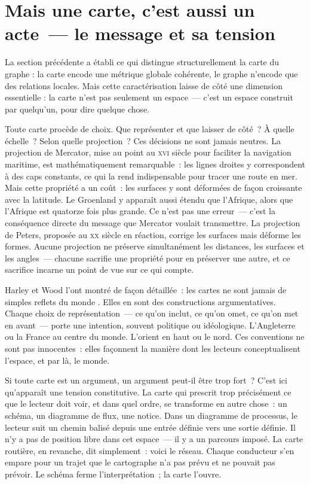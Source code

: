 \section[Le message et sa tension]{Mais une carte, c'est aussi un acte~--- le message et sa tension}

La section précédente a établi ce qui distingue structurellement la carte du graphe : la carte encode une métrique globale cohérente, le graphe n'encode que des relations locales. Mais cette caractérisation laisse de côté une dimension essentielle : la carte n'est pas seulement un espace~--- c'est un espace construit par quelqu'un, pour dire quelque chose.

Toute carte procède de choix. Que représenter et que laisser de côté~? À quelle échelle~? Selon quelle projection~? Ces décisions ne sont jamais neutres. La projection de Mercator, mise au point au \textsc{xvi} siècle pour faciliter la navigation maritime, est mathématiquement remarquable~: les lignes droites y correspondent à des caps constants, ce qui la rend indispensable pour tracer une route en mer. Mais cette propriété a un coût~: les surfaces y sont déformées de façon croissante avec la latitude. Le Groenland y apparaît aussi étendu que l'Afrique, alors que l'Afrique est quatorze fois plus grande. Ce n'est pas une erreur~--- c'est la conséquence directe du message que Mercator voulait transmettre. La projection de Peters, proposée au \textsc{xx} siècle en réaction, corrige les surfaces mais déforme les formes. Aucune projection ne préserve simultanément les distances, les surfaces et les angles~--- chacune sacrifie une propriété pour en préserver une autre, et ce sacrifice incarne un point de vue sur ce qui compte.

Harley et Wood l'ont montré de façon détaillée~: les cartes ne sont jamais de simples reflets du monde \parencite{harley2001, wood1992}. Elles en sont des constructions argumentatives. Chaque choix de représentation~--- ce qu'on inclut, ce qu'on omet, ce qu'on met en avant~--- porte une intention, souvent politique ou idéologique. L'Angleterre ou la France au centre du monde. L'orient en haut ou le nord. Ces conventions ne sont pas innocentes~: elles façonnent la manière dont les lecteurs conceptualisent l'espace, et par là, le monde.

Si toute carte est un argument, un argument peut-il être trop fort~? C'est ici qu'apparaît une tension constitutive. La carte qui prescrit trop précisément ce que le lecteur doit voir, et dans quel ordre, se transforme en autre chose~: un schéma, un diagramme de flux, une notice. Dans un diagramme de processus, le lecteur suit un chemin balisé depuis une entrée définie vers une sortie définie. Il n'y a pas de position libre dans cet espace~--- il y a un parcours imposé. La carte routière, en revanche, dit simplement~: voici le réseau. Chaque conducteur s'en empare pour un trajet que le cartographe n'a pas prévu et ne pouvait pas prévoir. Le schéma ferme l'interprétation~; la carte l'ouvre.

